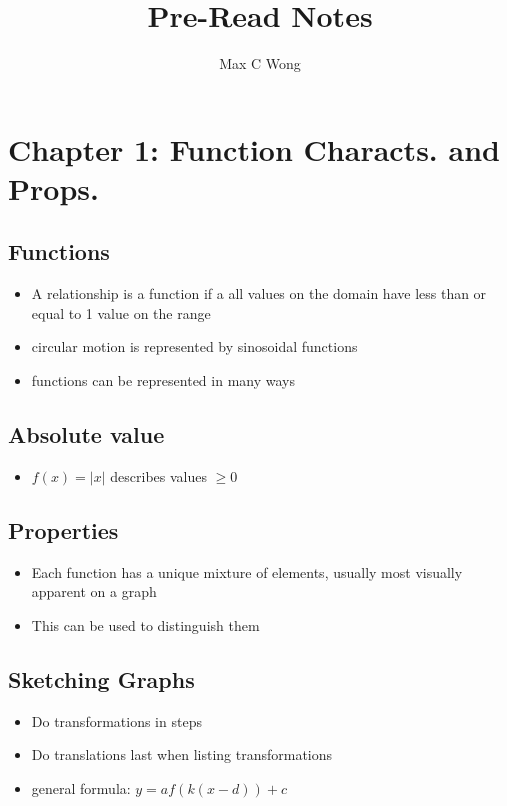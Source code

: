 \documentclass{article}
\begin{document}
\title{Pre-Read Notes}
\author{Max C Wong}
\maketitle

\tableofcontents
\clearpage

    \section{Chapter 1: Function Characts. and Props.}

    \subsection{Functions}
    \begin{itemize}
        \item A relationship is a function if a all values on the domain have less than or equal to 1 value on the range
        \item circular motion is represented by sinosoidal functions
        \item functions can be represented in many ways
    \end{itemize}

    \subsection{Absolute value}
    \begin{itemize}
        \item $f(x) = |x|$ describes values $\geq 0$ 
    \end{itemize}

    \subsection{Properties}
    \begin{itemize}
        \item Each function has a unique mixture of elements, usually most visually apparent on a graph
        \item This can be used to distinguish them
    \end{itemize}

    \subsection{Sketching Graphs}
    \begin{itemize}
        \item Do transformations in steps
        \item Do translations last when listing transformations
        \item general formula: $y = af(k(x - d)) + c$
    \end{itemize}
\end{document}
